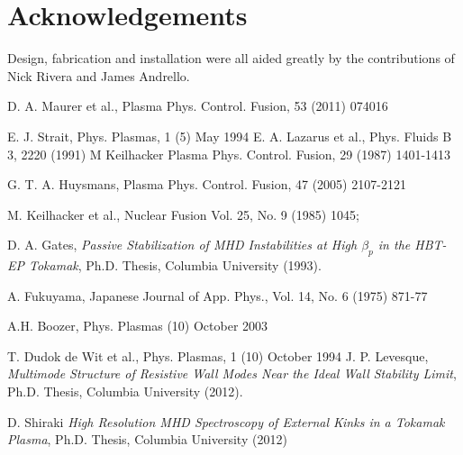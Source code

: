 \documentclass[aps,prl,twocolumn,superscriptaddress,groupedaddress]{revtex4}  %
\begin{document}
\section{Acknowledgements}
Design, fabrication and installation were all aided greatly by the contributions of Nick Rivera and James Andrello.

\begin{thebibliography}{99}
 D. A. Maurer et al., Plasma Phys. Control. Fusion, 53 (2011) 074016

 E. J. Strait, Phys. Plasmas, 1 (5) May 1994
 E. A. Lazarus et al., Phys. Fluids B 3, 2220 (1991)
 M Keilhacker Plasma Phys. Control. Fusion, 29 (1987) 1401-1413

 G. T. A. Huysmans, Plasma Phys. Control. Fusion, 47 (2005) 2107-2121 

 M. Keilhacker et al., Nuclear Fusion Vol. 25, No. 9 (1985) 1045;

 D. A. Gates, \emph{Passive Stabilization of MHD Instabilities at High ${\beta_p}$ in the HBT-EP Tokamak}, Ph.D. Thesis, Columbia University (1993).

 A. Fukuyama, Japanese Journal of App. Phys., Vol. 14, No. 6 (1975) 871-77 

 A.H. Boozer, Phys. Plasmas (10) October 2003


 T. Dudok de Wit et al., Phys. Plasmas, 1 (10) October 1994
 J. P. Levesque, \emph{Multimode Structure of Resistive Wall Modes Near the Ideal Wall Stability Limit}, Ph.D. Thesis, Columbia University (2012).

 D. Shiraki \emph{High Resolution MHD Spectroscopy of External Kinks in a Tokamak Plasma}, Ph.D. Thesis, Columbia University (2012)

\end{thebibliography}
\end{document}
